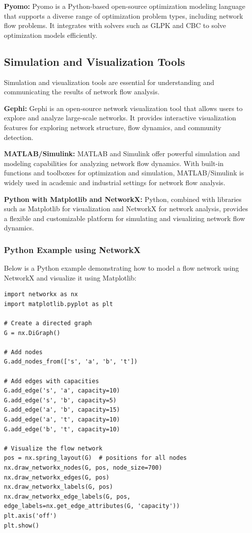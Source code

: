\documentclass[12pt]{book} %
\begin{document}
\textbf{Pyomo:} Pyomo is a Python-based open-source optimization modeling language that supports a diverse range of optimization problem types, including network flow problems. It integrates with solvers such as GLPK and CBC to solve optimization models efficiently.

\subsection{Simulation and Visualization Tools}

Simulation and visualization tools are essential for understanding and communicating the results of network flow analysis.

\textbf{Gephi:} Gephi is an open-source network visualization tool that allows users to explore and analyze large-scale networks. It provides interactive visualization features for exploring network structure, flow dynamics, and community detection.

\textbf{MATLAB/Simulink:} MATLAB and Simulink offer powerful simulation and modeling capabilities for analyzing network flow dynamics. With built-in functions and toolboxes for optimization and simulation, MATLAB/Simulink is widely used in academic and industrial settings for network flow analysis.

\textbf{Python with Matplotlib and NetworkX:} Python, combined with libraries such as Matplotlib for visualization and NetworkX for network analysis, provides a flexible and customizable platform for simulating and visualizing network flow dynamics.

\FloatBarrier
\subsubsection{Python Example using NetworkX}

Below is a Python example demonstrating how to model a flow network using NetworkX and visualize it using Matplotlib:

\begin{lstlisting}
import networkx as nx
import matplotlib.pyplot as plt

# Create a directed graph
G = nx.DiGraph()

# Add nodes
G.add_nodes_from(['s', 'a', 'b', 't'])

# Add edges with capacities
G.add_edge('s', 'a', capacity=10)
G.add_edge('s', 'b', capacity=5)
G.add_edge('a', 'b', capacity=15)
G.add_edge('a', 't', capacity=10)
G.add_edge('b', 't', capacity=10)

# Visualize the flow network
pos = nx.spring_layout(G)  # positions for all nodes
nx.draw_networkx_nodes(G, pos, node_size=700)
nx.draw_networkx_edges(G, pos)
nx.draw_networkx_labels(G, pos)
nx.draw_networkx_edge_labels(G, pos, edge_labels=nx.get_edge_attributes(G, 'capacity'))
plt.axis('off')
plt.show()
\end{lstlisting}
\FloatBarrier
\end{document}
